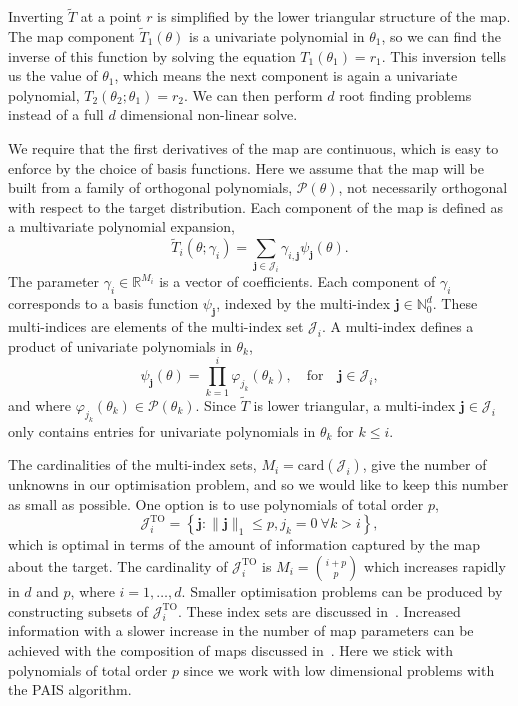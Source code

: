 \documentclass[final]{siamltex}
\begin{document}
Inverting $\tilde{T}$ at a point $r$ is simplified by the lower triangular structure of the map. The map component $\tilde{T}_1(\theta)$ is a univariate polynomial in $\theta_1$, so we can find the inverse of this function by solving the equation $T_1(\theta_1) = r_1$. This inversion tells us the value of $\theta_1$, which means the next component is again a univariate polynomial, $T_2(\theta_2; \theta_1)=r_2$. We can then perform $d$ root finding problems instead of a full $d$ dimensional non-linear solve.

We require that the first derivatives of the map are continuous, which is easy to enforce by the choice of basis functions. Here we assume that the map will be built from a family of orthogonal polynomials, $\mathcal{P}(\theta)$, not necessarily orthogonal with respect to the target distribution. Each component of the map is defined as a multivariate polynomial expansion,
\begin{equation}\label{eq:map_defn}
	\tilde{T}_i(\theta; \gamma_i) = \sum\limits_{\mathbf{j}\in\mathcal{J}_i} \!
\gamma_{i,\mathbf{j}}\psi_\mathbf{j}(\theta).
\end{equation}
The parameter $\gamma_i \in \mathbb{R}^{M_i}$ is a vector of coefficients. Each component of $\gamma_i$ corresponds to a basis function
$\psi_\mathbf{j}$, indexed by the multi-index $\mathbf{j} \in \mathbb{N}_0^d$. These multi-indices are elements of the multi-index set $\mathcal{J}_i$. A multi-index defines a product of univariate polynomials in $\theta_k$,
\[
	\psi_\mathbf{j}(\theta) = \prod\limits_{k=1}^i \! \varphi_{j_k}(\theta_k), \quad \text{for} \quad \mathbf{j} \in \mathcal{J}_i,
\]
and where $\varphi_{j_k}(\theta_k) \in \mathcal{P}(\theta_k)$. Since $\tilde{T}$ is lower triangular, a multi-index $\mathbf{j}\in\mathcal{J}_i$ only contains entries for univariate polynomials in $\theta_k$ for $k\leq i$.

The cardinalities of the multi-index sets, $M_i = \text{card}(\mathcal{J}_i)$, give the number of unknowns in our
optimisation problem, and so we would like to keep this number as small as possible. One option is
to use polynomials of total order $p$,
\[
	\mathcal{J}_i^\text{TO} = \left\{\mathbf{j}:\|\mathbf{j}\|_1 \leq p, j_k = 0\ \forall k > i\right\},
\]
which is optimal in terms of the amount of information captured by the map about the target. The cardinality of $\mathcal{J}_i^\text{TO}$ is $M_i = \binom{i+p}{p}$ which increases rapidly in $d$ and $p$, where $i = 1, \dots, d$. Smaller optimisation problems can be produced by constructing subsets of $\mathcal{J}_i^\text{TO}$. These index sets are discussed
in~\cite{parno2014transport}. Increased information with a slower increase in the number of map parameters can be achieved with the composition of maps discussed in~\cite{parno2015transport}. Here we stick with polynomials of total order $p$ since we work with low dimensional problems with the PAIS algorithm.
\end{document}
